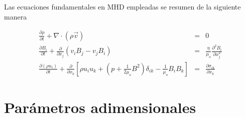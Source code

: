 \noindent Las ecuaciones fundamentales en MHD empleadas se resumen de la siguiente manera

\begin{eqnarray}
\frac{\partial \rho}{\partial t} + \nabla\cdot(\rho\vec{v}) &=& 0\nonumber\\
\frac{\partial B_{i}}{\partial t} + \frac{\partial}{\partial x_{j}}(v_{i}B_{j}-v_{j}B_{i}) &=& \frac{\eta}{\mu_{o}}\frac{\partial^{2}B_{i}}{\partial x_{j}^{2}}\\
\frac{\partial(\rho u_{i})}{\partial t}+\frac{\partial}{\partial x_{k}}\left[\rho u_{i}u_{k}+\left(p+\frac{1}{2\mu_{o}}B^{2}\right)\delta_{ik}-\frac{1}{\mu_{o}}B_{i}B_{k}\right] &=& \frac{\partial \sigma_{ik}}{\partial x_{k}}\nonumber
\end{eqnarray}




\section{Parámetros adimensionales}

